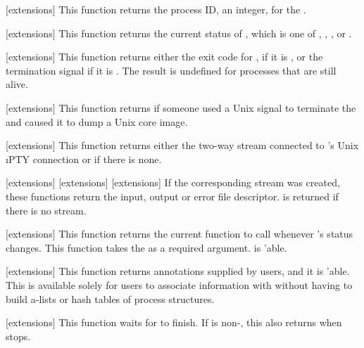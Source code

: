 [extensions]{}
This function returns the process ID, an integer, for the .
\enddefun

[extensions]{}
This function returns the current status of , which is one of
, , , or .
\enddefun

[extensions]{}
This function returns either the exit code for , if it is
, or the termination signal  if it is .  The
result is undefined for processes that are still alive.
\enddefun

[extensions]{}
This function returns \true{} if someone used a Unix signal to terminate the
 and caused it to dump a Unix core image.
\enddefun

[extensions]{}
This function returns either the two-way stream connected to
's Unix
\i{PTY} connection or \nil{} if there is none.
\enddefun

[extensions]{}
[extensions]{}
[extensions]{}
If the corresponding stream was created, these functions return the
input, output or error file descriptor.  \nil{} is returned if there is
no stream.
\enddefun

[extensions]{}
This function returns the current function to call whenever 's
status changes.  This function takes the  as a required argument.
 is 'able.
\enddefun

[extensions]{}
This function returns annotations supplied by users, and it is 'able.
This is available solely for users to associate information with 
without having to build a-lists or hash tables of process structures.
\enddefun

[extensions]{
        }
 This function waits for  to finish.  If  is
non-\nil, this also returns when  stops.
\enddefun

